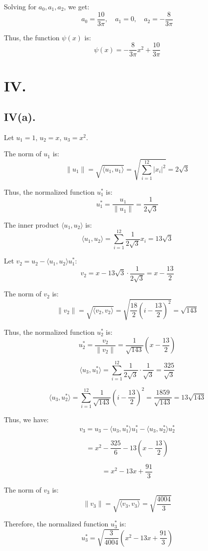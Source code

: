 \documentclass[a4paper]{article}
\begin{document}
Solving for \( a_0, a_1, a_2 \), we get:
\[
a_0 = \frac{10}{3\pi}, \quad a_1 = 0, \quad a_2 = -\frac{8}{3\pi}
\]

Thus, the function \( \psi(x) \) is:
\[
\psi(x) = -\frac{8}{3\pi} x^2 + \frac{10}{3\pi}
\]

\section*{IV.}

\subsection*{IV(a).}
Let \( u_1 = 1 \), \( u_2 = x \), \( u_3 = x^2 \).

The norm of \( u_1 \) is:
\[
\|u_1\| = \sqrt{\langle u_1, u_1 \rangle} = \sqrt{\sum_{i=1}^{12} |x_i|^2} = 2\sqrt{3}
\]

Thus, the normalized function \( u_1^* \) is:
\[
u_1^* = \frac{u_1}{\|u_1\|} = \frac{1}{2\sqrt{3}}
\]

The inner product \( \langle u_1, u_2 \rangle \) is:
\[
\langle u_1, u_2 \rangle = \sum_{i=1}^{12} \frac{1}{2\sqrt{3}} x_i = 13\sqrt{3}
\]

Let \( v_2 = u_2 - \langle u_1, u_2 \rangle u_1^* \):
\[
v_2 = x - 13\sqrt{3} \cdot \frac{1}{2\sqrt{3}} = x - \frac{13}{2}
\]

The norm of \( v_2 \) is:
\[
\|v_2\| = \sqrt{\langle v_2, v_2 \rangle} = \sqrt{\frac{18}{2} \left(i - \frac{13}{2}\right)^2} = \sqrt{143}
\]

Thus, the normalized function \( u_2^* \) is:
\[
u_2^* = \frac{v_2}{\|v_2\|} = \frac{1}{\sqrt{143}} \left(x - \frac{13}{2}\right)
\]

\[
\langle u_3, u_1^* \rangle = \sum_{i=1}^{12} \frac{1}{2\sqrt{3}} \cdot \frac{1}{\sqrt{3}} = \frac{325}{\sqrt{3}}
\]

\[
\langle u_3, u_2^* \rangle = \sum_{i=1}^{12} \frac{1}{\sqrt{143}} \left(i - \frac{13}{2}\right)^2 = \frac{1859}{\sqrt{143}} = 13\sqrt{143}
\]

Thus, we have:
\[
v_3 = u_3 - \langle u_3, u_1^* \rangle u_1^* - \langle u_3, u_2^* \rangle u_2^*
\]

\[
= x^2 - \frac{325}{6} - 13\left(x - \frac{13}{2}\right)
\]

\[
= x^2 - 13x + \frac{91}{3}
\]

The norm of \( v_3 \) is:
\[
\|v_3\| = \sqrt{\langle v_3, v_3 \rangle} = \sqrt{\frac{4004}{3}}
\]

Therefore, the normalized function \( u_3^* \) is:
\[
u_3^* = \sqrt{\frac{3}{4004}} \left(x^2 - 13x + \frac{91}{3}\right)
\]
\end{document}
